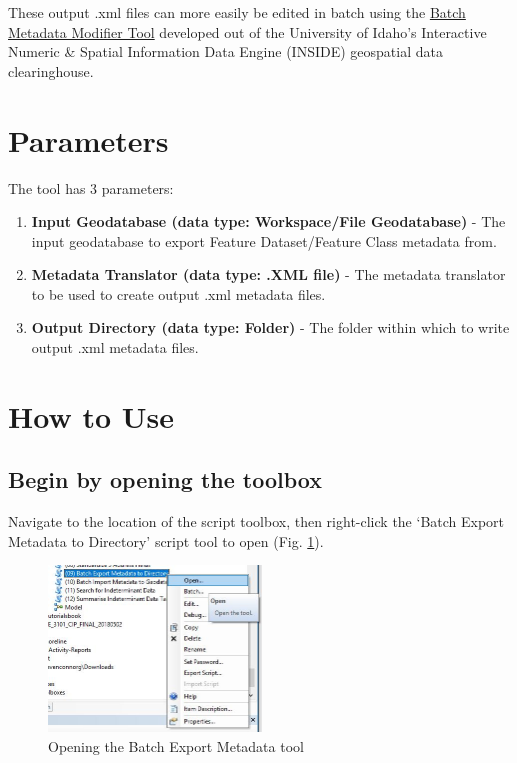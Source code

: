 \documentclass[openany]{book}
\providecommand{\tightlist}{%
  \setlength{\itemsep}{0pt}\setlength{\parskip}{0pt}}
\theoremstyle{definition}
\theoremstyle{definition}
\theoremstyle{definition}
\theoremstyle{remark}
\begin{document}
These output .xml files can more easily be edited in batch using the
\href{http://insideidaho.org/helpdocs/batch_metadata_modifier_tool.html}{Batch
Metadata Modifier Tool} developed out of the University of Idaho's
Interactive Numeric \& Spatial Information Data Engine (INSIDE)
geospatial data clearinghouse.

\section{Parameters}\label{parameters-10}

The tool has 3 parameters:

\begin{enumerate}
\def\labelenumi{\arabic{enumi}.}
\tightlist
\item
  \textbf{Input Geodatabase (data type: Workspace/File Geodatabase)} -
  The input geodatabase to export Feature Dataset/Feature Class metadata
  from.
\item
  \textbf{Metadata Translator (data type: .XML file)} - The metadata
  translator to be used to create output .xml metadata files.
\item
  \textbf{Output Directory (data type: Folder)} - The folder within
  which to write output .xml metadata files.
\end{enumerate}

\section{How to Use}\label{how-to-use-10}

\subsection{Begin by opening the
toolbox}\label{begin-by-opening-the-toolbox-10}

Navigate to the location of the script toolbox, then right-click the
`Batch Export Metadata to Directory' script tool to open (Fig.
\ref{fig:exMetaopen}).

\begin{figure}[H]

{\centering \includegraphics[width=2.23in,]{figures/exMeta-open} 

}

\caption{Opening the Batch Export Metadata tool}\label{fig:exMetaopen}
\end{figure}
\end{document}
